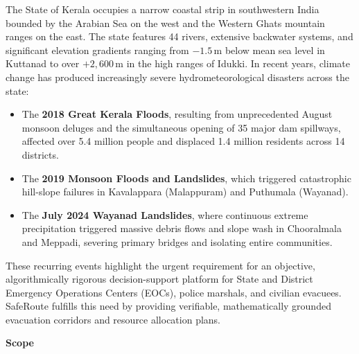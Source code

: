 \documentclass[12pt,oneside]{report}
\begin{document}
The State of Kerala occupies a narrow coastal strip in southwestern India bounded by the Arabian Sea on the west and the Western Ghats mountain ranges on the east. The state features 44 rivers, extensive backwater systems, and significant elevation gradients ranging from $-1.5$\,m below mean sea level in Kuttanad to over $+2,600$\,m in the high ranges of Idukki. In recent years, climate change has produced increasingly severe hydrometeorological disasters across the state:
\begin{itemize}
    \item The \textbf{2018 Great Kerala Floods}, resulting from unprecedented August monsoon deluges and the simultaneous opening of 35 major dam spillways, affected over 5.4 million people and displaced 1.4 million residents across 14 districts.
    \item The \textbf{2019 Monsoon Floods and Landslides}, which triggered catastrophic hill-slope failures in Kavalappara (Malappuram) and Puthumala (Wayanad).
    \item The \textbf{July 2024 Wayanad Landslides}, where continuous extreme precipitation triggered massive debris flows and slope wash in Chooralmala and Meppadi, severing primary bridges and isolating entire communities.
\end{itemize}
These recurring events highlight the urgent requirement for an objective, algorithmically rigorous decision-support platform for State and District Emergency Operations Centers (EOCs), police marshals, and civilian evacuees. SafeRoute fulfills this need by providing verifiable, mathematically grounded evacuation corridors and resource allocation plans.

\textbf{Scope}
\end{document}

